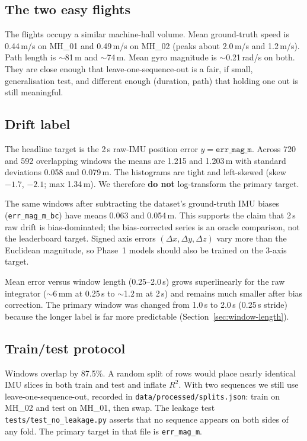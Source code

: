 \subsection{The two easy flights}
The flights occupy a similar machine-hall volume. Mean ground-truth
speed is 0.44\,m/s on MH\_01 and 0.49\,m/s on MH\_02 (peaks about
2.0\,m/s and 1.2\,m/s). Path length is $\sim$81\,m and $\sim$74\,m.
Mean gyro magnitude is $\sim$0.21\,rad/s on both. They are close enough
that leave-one-sequence-out is a fair, if small, generalisation test,
and different enough (duration, path) that holding one out is still
meaningful.

\subsection{Drift label}
The headline target is the 2\,s raw-IMU position error $y=\texttt{err\_mag\_m}$.
Across 720 and 592 overlapping windows the means are 1.215 and 1.203\,m
with standard deviations 0.058 and 0.079\,m. The histograms are tight and
left-skewed (skew $-1.7$, $-2.1$; max 1.34\,m). We therefore
\textbf{do not} log-transform the primary target.

The same windows after subtracting the dataset's ground-truth IMU biases
(\texttt{err\_mag\_m\_bc}) have means 0.063 and 0.054\,m. This
supports the claim that 2\,s raw drift is bias-dominated; the
bias-corrected series is an oracle comparison, not the leaderboard
target. Signed axis errors $({\Delta}x,{\Delta}y,{\Delta}z)$ vary more
than the Euclidean magnitude, so Phase~1 models should also be trained
on the 3-axis target.

Mean error versus window length (0.25--2.0\,s) grows superlinearly for
the raw integrator ($\sim$6\,mm at 0.25\,s to $\sim$1.2\,m at 2\,s) and
remains much smaller after bias correction. The primary window was
changed from 1.0\,s to 2.0\,s (0.25\,s stride) because the longer label is
far more predictable (Section~\ref{sec:window-length}).

\subsection{Train/test protocol}
Windows overlap by 87.5\%. A random split of rows would place nearly
identical IMU slices in both train and test and inflate $R^2$. With two
sequences we still use leave-one-sequence-out, recorded in
\texttt{data/processed/splits.json}: train on MH\_02 and test on MH\_01,
then swap. The leakage test \texttt{tests/test\_no\_leakage.py} asserts
that no sequence appears on both sides of any fold. The primary target
in that file is \texttt{err\_mag\_m}.
